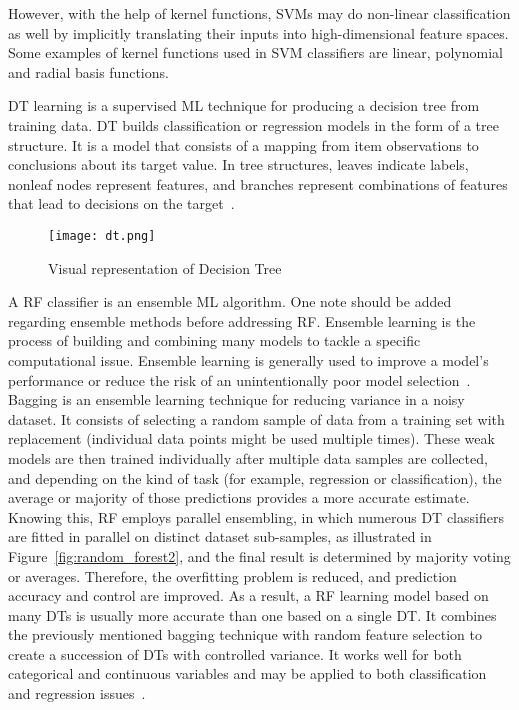 However, with the help of kernel functions, \gls{SVM}s may do non-linear classification as well by implicitly translating their inputs into high-dimensional feature spaces. Some examples of kernel functions used in \gls{SVM} classifiers are linear, polynomial and radial basis functions.

\gls{DT} learning is a supervised \gls{ML} technique for producing a decision tree from training data. \gls{DT} builds classification or regression models in the form of a tree structure. It is a model that consists of a mapping from item observations to conclusions about its target value. In tree structures, leaves indicate labels, nonleaf nodes represent features, and branches represent combinations of features that lead to decisions on the target~\cite{Tan2015CodeQuality}.

\begin{figure}[htbp]
    \centering
    \texttt{[image: dt.png]}
    \caption{Visual representation of Decision Tree}
    \label{fig:dt}
\end{figure}

A \gls{RF} classifier is an ensemble \gls{ML} algorithm. One note should be added regarding ensemble methods before addressing \gls{RF}. Ensemble learning is the process of building and combining many models to tackle a specific computational issue. Ensemble learning is generally used to improve a model's performance or reduce the risk of an unintentionally poor model selection~\cite{Mahesh2019MachineReview}. Bagging is an ensemble learning technique for reducing variance in a noisy dataset. It consists of selecting a random sample of data from a training set with replacement (individual data points might be used multiple times). These weak models are then trained individually after multiple data samples are collected, and depending on the kind of task (for example, regression or classification), the average or majority of those predictions provides a more accurate estimate. Knowing this, \gls{RF} employs parallel ensembling, in which numerous \gls{DT} classifiers are fitted in parallel on distinct dataset sub-samples, as illustrated in Figure~\ref{fig:random_forest2}, and the final result is determined by majority voting or averages. Therefore, the overfitting problem is reduced, and prediction accuracy and control are improved. As a result, a \gls{RF} learning model based on many \gls{DT}s is usually more accurate than one based on a single \gls{DT}. It combines the previously mentioned bagging technique with random feature selection to create a succession of \gls{DT}s with controlled variance. It works well for both categorical and continuous variables and may be applied to both classification and regression issues~\cite{Sarker2021MachineDirections}.

